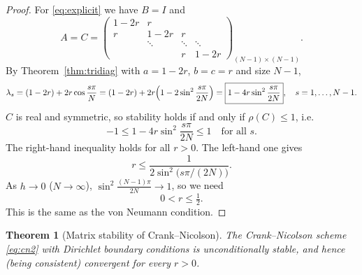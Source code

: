 \documentclass[11pt,a4paper]{article}
\numberwithin{equation}{section}
\theoremstyle{spacedplain}
\newtheorem{theorem}{Theorem}[section]
\theoremstyle{spaceddefinition}
\theoremstyle{spacedremark}
\begin{document}
\begin{proof}
For \eqref{eq:explicit} we have \(B=I\) and
\[
  A=C=\begin{pmatrix}1-2r&r&&\\ r&1-2r&r&\\ &\ddots&\ddots&\ddots\\ &&r&1-2r\end{pmatrix}_{(N-1)\times(N-1)}.
\]
By Theorem~\ref{thm:tridiag} with \(a=1-2r\), \(b=c=r\) and size
\(N-1\),
\[
  \lambda_s=(1-2r)+2r\cos\frac{s\pi}N
  =(1-2r)+2r\Bigl(1-2\sin^2\frac{s\pi}{2N}\Bigr)
  =\boxed{1-4r\sin^2\frac{s\pi}{2N}},
  \quad s=1,\dots,N-1.
\]
\(C\) is real and symmetric, so stability holds if and only if
\(\rho(C)\le1\), i.e.
\[
  -1\le1-4r\sin^2\frac{s\pi}{2N}\le1\quad\text{for all }s.
\]
The right-hand inequality holds for all \(r>0\).  The left-hand one
gives
\[
  r\le\frac1{2\sin^2\bigl(s\pi/(2N)\bigr)}.
\]
As \(h\to0\) (\(N\to\infty\)), \(\sin^2\frac{(N-1)\pi}{2N}\to1\), so we
need
\[
  \boxed{0<r\le\tfrac12}.
\]
This is the same as the von Neumann condition.
\end{proof}

\begin{keybox}
\begin{theorem}[Matrix stability of Crank--Nicolson]\label{thm:mcn}
The Crank--Nicolson scheme \eqref{eq:cn2} with Dirichlet boundary
conditions is unconditionally stable, and hence (being consistent)
convergent for every \(r>0\).
\end{theorem}
\end{keybox}
\end{document}
